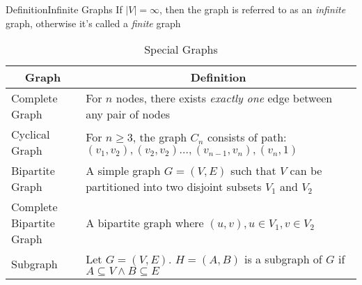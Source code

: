 \documentclass{MathNotes}
\newenvironment{definition}[1]{\begin{RedBox}{Definition}{#1}}{\end{RedBox}}
\begin{document}
\begin{definition}{Infinite Graphs}\label{def:infinite-graph}
	If $|V|=\infty$, then the graph is referred to as an \textit{infinite} graph,
	otherwise it's called a \textit{finite} graph
\end{definition}
\newpage
\begin{table}[h!]\label{tab:special-graphs}
	\centering
	\caption{Special Graphs}
	\begin{tabular}{ll}
		\multicolumn{1}{c}{\textbf{Graph}} &
		\multicolumn{1}{c}{\textbf{Definition}}                                                                          \\
		\midrule
		Complete Graph                     &
		For $n$ nodes, there exists \textit{exactly one} edge between any
		pair of nodes                                                                                                    \\
		Cyclical Graph                     &
		\parbox{30em}{For $n\geq3$, the graph $C_n$ consists of path: $(v_1,v_2),(v_2,v_2)\ldots,(v_{n-1},v_n),(v_n,1)$} \\
		Bipartite Graph                    &
		\parbox{30em}{A simple graph $G=(V,E)$ such that $V$ can be partitioned into
		two disjoint subsets $V_1$ and $V_2$}                                                                            \\
		Complete Bipartite Graph           &
		\parbox{30em}{A bipartite graph where $(u,v), u\in V_1,v\in V_2$}                                                \\
		Subgraph                           & Let $G=(V,E)$. $H=(A,B)$ is a subgraph of $G$ if
		$A\subseteq V\land B\subseteq E$
	\end{tabular}
\end{table}
\end{document}
